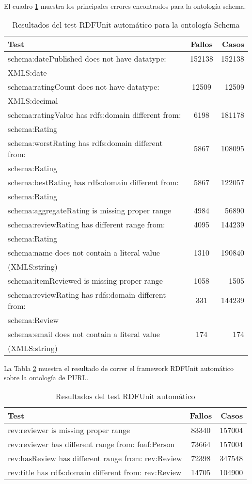 El cuadro \ref{table:RDFUnitSchemaAutomatic} muestra los principales errores encontrados para la ontología schema.
\begin{table}[h]
\begin{tabular}{| l | c | r | }\hline
Test & Fallos & Casos \\\hline
 schema:datePublished does not have datatype:& 152138 & 152138\\ XMLS:date & & \\\hline
 schema:ratingCount does not have datatype: & 12509 & 12509\\ XMLS:decimal & & \\\hline
 schema:ratingValue has rdfs:domain different from:& 6198 & 181178\\ schema:Rating & & \\\hline
 schema:worstRating has rdfs:domain different from:& 5867 & 108095\\ schema:Rating & & \\\hline
 schema:bestRating has rdfs:domain different from:& 5867 & 122057\\ schema:Rating & & \\\hline
 schema:aggregateRating is missing proper range & 4984 & 56890\\\hline
 schema:reviewRating has different range from: & 4095 & 144239\\ schema:Rating & & \\\hline
 schema:name does not contain a literal value & 1310 & 190840\\ (XMLS:string) & & \\\hline
 schema:itemReviewed is missing proper range & 1058 & 1505\\\hline
 schema:reviewRating has rdfs:domain different from:& 331 & 144239\\ schema:Review & & \\\hline
 schema:email does not contain a literal value & 174  & 174 \\ (XMLS:string) & & \\\hline
\end{tabular}
\caption{Resultados del test RDFUnit automático para la ontología Schema}
\label{table:RDFUnitSchemaAutomatic}
\end{table}

La Tabla \ref{table:RDFUnitPurlAutomatic} muestra el resultado de correr el framework RDFUnit automático sobre la ontología de PURL.
\begin{table}[h]
\begin{tabular}{| l | c | r | }\hline
Test & Fallos & Casos \\\hline
 rev:reviewer is missing proper range & 83340 & 157004\\
 rev:reviewer has different range from: foaf:Person & 73664 & 157004\\
 rev:hasReview has different range from: rev:Review & 72398 & 347548\\
 rev:title has rdfs:domain different from: rev:Review & 14705 & 104900 \\ \hline
\end{tabular}
\caption{Resultados del test RDFUnit automático}
\label{table:RDFUnitPurlAutomatic}
\end{table}

